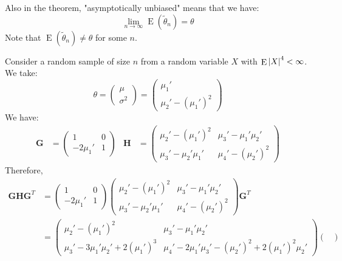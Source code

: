 \documentclass{huhtakm-template-book-v2}
\DeclareMathOperator{\E}{E}
\begin{document}
\newpage
\begin{rem}
	Also in the theorem, "asymptotically unbiased" means that we have:
	\begin{equation*}
		\lim_{n\to\infty}\E(\tilde{\theta}_{n})=\theta
	\end{equation*}
	Note that $\E(\tilde{\theta}_{n})\neq\theta$ for some $n$.
\end{rem}
\begin{eg}
	Consider a random sample of size $n$ from a random variable $X$ with $\E\abs{X}^{4}<\infty$. We take:
	\begin{equation*}
		\theta=\begin{pmatrix}
			\mu\\ \sigma^{2}
		\end{pmatrix}=\begin{pmatrix}
			\mu_{1}'\\ \mu_{2}'-(\mu_{1}')^{2}
		\end{pmatrix}
	\end{equation*}
	We have:
	\begin{align*}
		\mathbf{G}&=\begin{pmatrix}
			1 & 0\\
			-2\mu_{1}' & 1
		\end{pmatrix} & \mathbf{H}&=\begin{pmatrix}
			\mu_{2}'-(\mu_{1}')^{2} & \mu_{3}'-\mu_{1}'\mu_{2}'\\
			\mu_{3}'-\mu_{2}'\mu_{1}' & \mu_{4}'-(\mu_{2}')^{2}
		\end{pmatrix}
	\end{align*}
	Therefore,
	\begin{align*}
		\mathbf{GHG}^{T}&=\begin{pmatrix}
			1 & 0\\
			-2\mu_{1}' & 1
		\end{pmatrix}\begin{pmatrix}
		\mu_{2}'-(\mu_{1}')^{2} & \mu_{3}'-\mu_{1}'\mu_{2}'\\
		\mu_{3}'-\mu_{2}'\mu_{1}' & \mu_{4}'-(\mu_{2}')^{2}
		\end{pmatrix}\mathbf{G}^{T}\\
		&=\begin{pmatrix}
			\mu_{2}'-(\mu_{1}')^{2} & \mu_{3}'-\mu_{1}'\mu_{2}'\\
			\mu_{3}'-3\mu_{1}'\mu_{2}'+2(\mu_{1}')^{3} & \mu_{4}'-2\mu_{1}'\mu_{3}'-(\mu_{2}')^{2}+2(\mu_{1}')^{2}\mu_{2}'
		\end{pmatrix}\begin{pmatrix}

\end{pmatrix}
\end{align*}
\end{eg}
\end{document}
